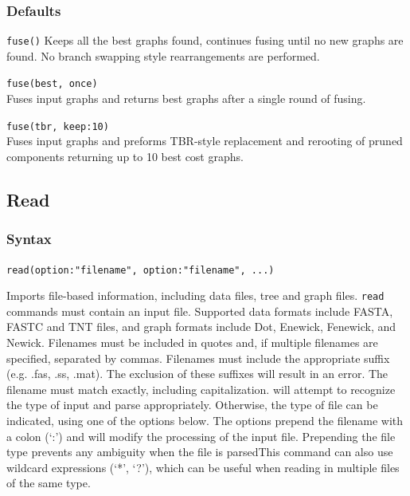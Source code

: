 	\subsubsection{Defaults}
		\texttt{fuse()} Keeps all the best graphs found, continues fusing until no new graphs are found. 
		No branch swapping style rearrangements are performed.
	
	\begin{example}
	
		\item{\texttt{fuse(best, once)}\\Fuses input graphs and returns best graphs after a single round of 
		fusing.}
		
		\item{\texttt{fuse(tbr, keep:10)} \\Fuses input graphs and preforms TBR-style replacement and 
		rerooting of pruned components returning up to 10 best cost graphs.}
		
	\end{example}

\subsection{Read}
	\label{subsec:Read}
	\subsubsection{Syntax}
		\texttt{read(option:"filename", option:"filename", ...)}
			
	\begin{phygdescription}
		{Imports file-based information, including data files, tree and graph files. \texttt{read} 
		commands must contain an input file. Supported data formats include FASTA, FASTC
		and TNT files, and graph formats include Dot, Enewick, Fenewick, and Newick. 
		Filenames must be included in quotes and, if multiple filenames are specified, 
		separated by commas. Filenames must include the appropriate suffix (e.g. .fas, 
		.ss, .mat). The exclusion of these suffixes will result in an error. The filename must
		match exactly, including capitalization. \phyg will attempt to recognize the type of input
		and parse appropriately. Otherwise, the type of file can be indicated, using one of the 
		options below. The options prepend 	the filename with a colon (`:') and will modify the 
		processing of the input file. Prepending the file type prevents any ambiguity when the 
		file is parsedThis command can also use wildcard expressions (`*', `?'), 
		which can be useful when reading in multiple files of the same type.}
	\end{phygdescription}

